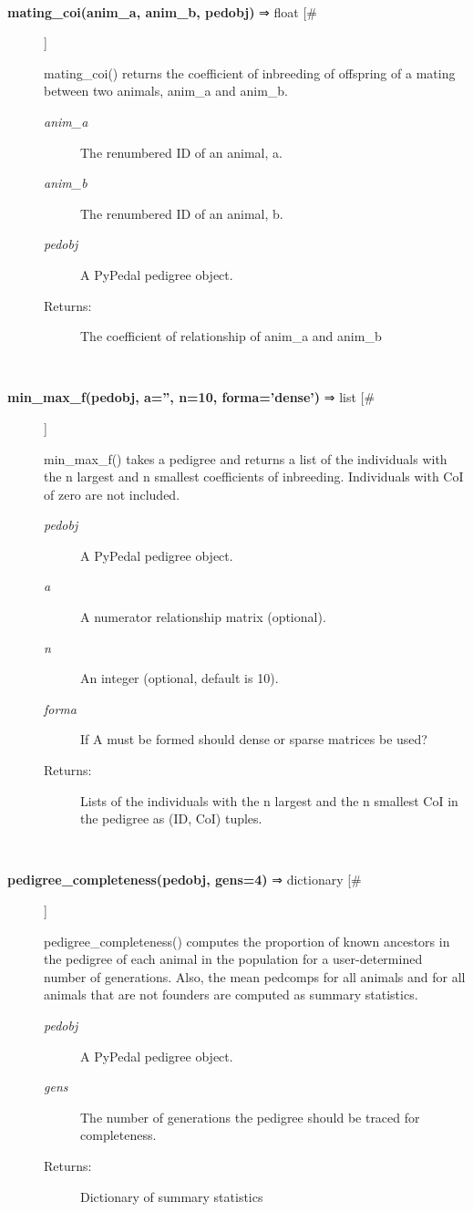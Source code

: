 \documentclass[10pt]{article}
\begin{document}
\begin{description}
\begin{description}
\end{description}
\\ 

\item[\textbf{mating\_coi(anim\_a, anim\_b, pedobj)}
 ⇒ float [\#]]

 mating\_coi() returns the coefficient of inbreeding of offspring of a mating between two animals, anim\_a and anim\_b.
\begin{description}
\item[\emph{anim\_a}
] The renumbered ID of an animal, a.
\item[\emph{anim\_b}
] The renumbered ID of an animal, b.
\item[\emph{pedobj}
] A PyPedal pedigree object.
\item[Returns:] The coefficient of relationship of anim\_a and anim\_b

\end{description}
\\ 

\item[\textbf{min\_max\_f(pedobj, a='', n=10, forma='dense')}
 ⇒ list [\#]]

 min\_max\_f() takes a pedigree and returns a list of the individuals with the n largest and n smallest coefficients of inbreeding. Individuals with CoI of zero are not included.
\begin{description}
\item[\emph{pedobj}
] A PyPedal pedigree object.
\item[\emph{a}
] A numerator relationship matrix (optional).
\item[\emph{n}
] An integer (optional, default is 10).
\item[\emph{forma}
] If A must be formed should dense or sparse matrices be used?
\item[Returns:] Lists of the individuals with the n largest and the n smallest CoI in the pedigree as (ID, CoI) tuples.

\end{description}
\\ 

\item[\textbf{pedigree\_completeness(pedobj, gens=4)}
 ⇒ dictionary [\#]]

 pedigree\_completeness() computes the proportion of known ancestors in the pedigree of each animal in the population for a user-determined number of generations. Also, the mean pedcomps for all animals and for all animals that are not founders are computed as summary statistics.
\begin{description}
\item[\emph{pedobj}
] A PyPedal pedigree object.
\item[\emph{gens}
] The number of generations the pedigree should be traced for completeness.
\item[Returns:] Dictionary of summary statistics


\end{description}
\end{description}
\end{document}
